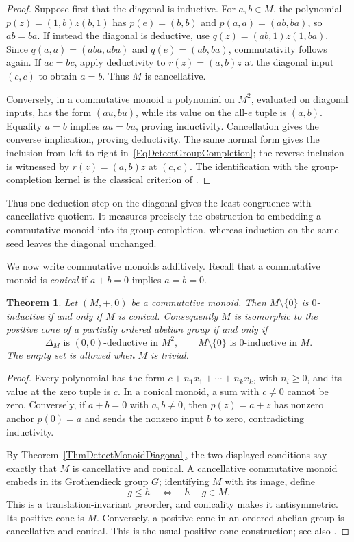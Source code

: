 \documentclass[12pt,english]{amsart}
\newtheorem{theorem}{Theorem}[section]
\theoremstyle{definition}
\numberwithin{equation}{section}
\theoremstyle{remark}
\begin{document}
\begin{proof}
Suppose first that the diagonal is inductive. For $a,b\in M$, the
polynomial $p(z)=(1,b)z(b,1)$ has
$p(e)=(b,b)$ and $p(a,a)=(ab,ba)$, so $ab=ba$.
If instead the diagonal is deductive, use
$q(z)=(ab,1)z(1,ba)$. Since
$q(a,a)=(aba,aba)$ and $q(e)=(ab,ba)$, commutativity follows again.
If $ac=bc$, apply deductivity to $r(z)=(a,b)z$ at the diagonal
input $(c,c)$ to obtain $a=b$. Thus $M$ is cancellative.

Conversely, in a commutative monoid a polynomial on $M^2$, evaluated
on diagonal inputs, has the form $(au,bu)$, while its value on the
all-$e$ tuple is $(a,b)$. Equality $a=b$ implies $au=bu$, proving
inductivity. Cancellation gives the converse implication, proving
deductivity. The same normal form gives the inclusion from left
to right in~\eqref{EqDetectGroupCompletion}; the reverse inclusion
is witnessed by $r(z)=(a,b)z$ at $(c,c)$.
The identification with the group-completion kernel is the classical
criterion of \cite[Proposition II.1.1(b)]{DetWei13}.
\end{proof}

Thus one deduction step on the diagonal gives the least congruence
with cancellative quotient. It measures precisely the obstruction
to embedding a commutative monoid into its group completion,
whereas induction on the same seed leaves the diagonal unchanged.

We now write commutative monoids additively. Recall that a commutative
monoid is \emph{conical} if $a+b=0$ implies $a=b=0$.

\begin{theorem}\label{ThmDetectPositiveCone}
Let $(M,+,0)$ be a commutative monoid. Then
$M\setminus\{0\}$ is $0$-inductive if and only if $M$ is conical.
Consequently $M$ is isomorphic to the positive cone of a partially
ordered abelian group if and only if
\[
\Delta_M\text{ is $(0,0)$-deductive in }M^2,
\qquad
M\setminus\{0\}\text{ is $0$-inductive in }M.
\]
The empty set is allowed when $M$ is trivial.
\end{theorem}

\begin{proof}
Every polynomial has the form
$c+n_1x_1+\cdots+n_kx_k$, with $n_i\geqslant0$, and its value at
the zero tuple is $c$. In a conical monoid, a sum with $c\ne0$
cannot be zero. Conversely, if $a+b=0$ with $a,b\ne0$, then
$p(z)=a+z$ has nonzero anchor $p(0)=a$ and sends the nonzero input
$b$ to zero, contradicting inductivity.

By Theorem~\ref{ThmDetectMonoidDiagonal}, the two displayed conditions
say exactly that $M$ is cancellative and conical. A cancellative
commutative monoid embeds in its Grothendieck group $G$; identifying
$M$ with its image, define
\[
g\leqslant h\quad\Longleftrightarrow\quad h-g\in M.
\]
This is a translation-invariant preorder, and conicality makes it
antisymmetric. Its positive cone is $M$. Conversely, a positive
cone in an ordered abelian group is cancellative and conical.
This is the usual positive-cone construction; see also
\cite[Proposition 2.5]{DetSti12}.
\end{proof}
\end{document}
